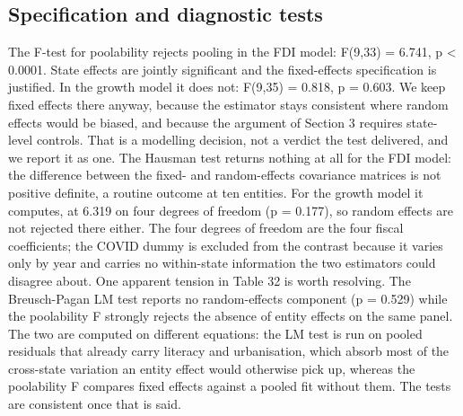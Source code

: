 \documentclass[12pt,a4paper]{article}
\begin{document}
\subsection{Specification and diagnostic tests}

The F-test for poolability rejects pooling in the FDI model: F(9,33) = 6.741, p < 0.0001. State effects are jointly significant and the fixed-effects specification is justified. In the growth model it does not: F(9,35) = 0.818, p = 0.603. We keep fixed effects there anyway, because the estimator stays consistent where random effects would be biased, and because the argument of Section 3 requires state-level controls. That is a modelling decision, not a verdict the test delivered, and we report it as one. The Hausman test returns nothing at all for the FDI model: the difference between the fixed- and random-effects covariance matrices is not positive definite, a routine outcome at ten entities. For the growth model it computes, at 6.319 on four degrees of freedom (p = 0.177), so random effects are not rejected there either. The four degrees of freedom are the four fiscal coefficients; the COVID dummy is excluded from the contrast because it varies only by year and carries no within-state information the two estimators could disagree about. One apparent tension in Table 32 is worth resolving. The Breusch-Pagan LM test reports no random-effects component (p = 0.529) while the poolability F strongly rejects the absence of entity effects on the same panel. The two are computed on different equations: the LM test is run on pooled residuals that already carry literacy and urbanisation, which absorb most of the cross-state variation an entity effect would otherwise pick up, whereas the poolability F compares fixed effects against a pooled fit without them. The tests are consistent once that is said.
\end{document}
